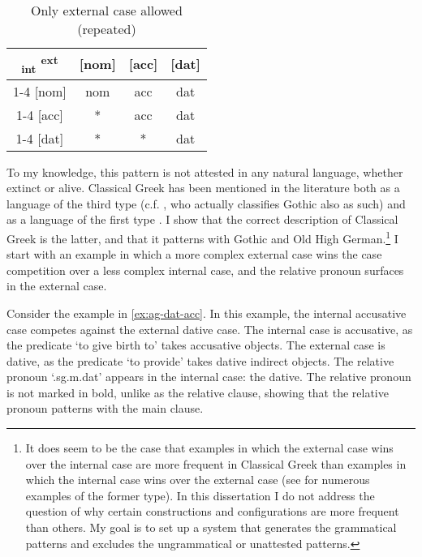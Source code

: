 \begin{table}[ht]
  \center
  \caption{Only external case allowed (repeated)}
  \begin{tabular}{c|c|c|c}
    \toprule
    \textsubscript{\ac{int}} \textsuperscript{\ac{ext}}
           & [\ac{nom}]
           & [\ac{acc}]
           & [\ac{dat}]
           \\ \cmidrule{1-4}
       [\ac{nom}]
           & \ac{nom}
           & \ac{acc}
           & \ac{dat}
           \\ \cmidrule{1-4}
       [\ac{acc}]
           & *
           & \ac{acc}
           & \ac{dat}
           \\ \cmidrule{1-4}
       [\ac{dat}]
           & *
           & *
           & \ac{dat}
           \\
     \bottomrule
  \end{tabular}
    \label{tbl:case-competition-only-ext-repeated}
\end{table}

To my knowledge, this pattern is not attested in any natural language, whether extinct or alive. Classical Greek has been mentioned in the literature both as a language of the third type (c.f. \citealt[120]{cinqueforthcoming}, who actually classifies Gothic also as such) and as a language of the first type \citep[cf.][41]{grosu1987}. I show that the correct description of Classical Greek is the latter, and that it patterns with Gothic and Old High German.\footnote{
It does seem to be the case that examples in which the external case wins over the internal case are more frequent in Classical Greek than examples in which the internal case wins over the external case (see \citealt{kakarikos2014} for numerous examples of the former type).
In this dissertation I do not address the question of why certain constructions and configurations are more frequent than others. My goal is to set up a system that generates the grammatical patterns and excludes the ungrammatical or unattested patterns.
}
I start with an example in which a more complex external case wins the case competition over a less complex internal case, and the relative pronoun surfaces in the external case.

Consider the example in \ref{ex:ag-dat-acc}. In this example, the internal accusative case competes against the external dative case.
The internal case is accusative, as the predicate  `to give birth to' takes accusative objects.
The external case is dative, as the predicate  `to provide' takes dative indirect objects.
The relative pronoun  `.\ac{sg}.\ac{m}.\ac{dat}' appears in the internal case: the dative. The relative pronoun is not marked in bold, unlike as the relative clause, showing that the relative pronoun patterns with the main clause.

